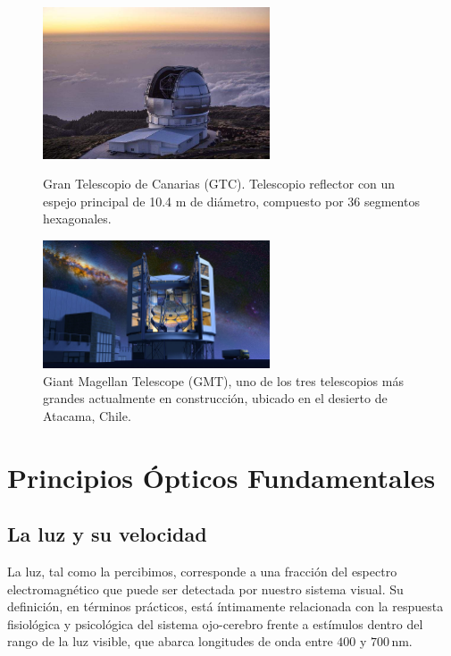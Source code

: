 \begin{figure}[H]
	\centering
	\includegraphics[width=0.6\textwidth]{images/gran_telescopio_canarias.jpg}
	\caption{Gran Telescopio de Canarias (GTC). Telescopio reflector con un espejo principal de 10.4 m de diámetro, compuesto por 36 segmentos hexagonales.}
	\label{fig:gran_telescopio_canarias}
	
	\includegraphics[width=0.6\textwidth]{images/giant_magallan_telescope.jpg}
	\caption{Giant Magellan Telescope (GMT), uno de los tres telescopios más grandes actualmente en construcción, ubicado en el desierto de Atacama, Chile.}
	\label{fig:gmt_chile}
\end{figure}


\section{Principios Ópticos Fundamentales}

\subsection*{La luz y su velocidad}

La luz, tal como la percibimos, corresponde a una fracción del espectro electromagnético que puede ser detectada por nuestro sistema visual. Su definición, en términos prácticos, está íntimamente relacionada con la respuesta fisiológica y psicológica del sistema ojo-cerebro frente a estímulos dentro del rango de la luz visible, que abarca longitudes de onda entre $400$ y $700\,\mathrm{nm}$.

